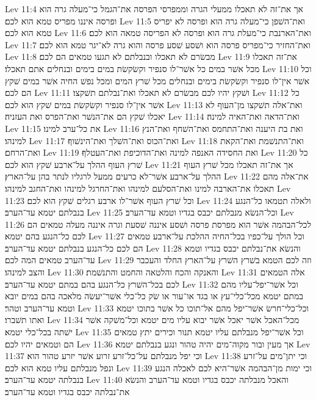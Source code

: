 Lev 11:4  אך את־זה לא תאכלו ממעלי הגרה וממפרסי הפרסה את־הגמל כי־מעלה גרה הוא ופרסה איננו מפריס טמא הוא לכם׃
Lev 11:5  ואת־השׁפן כי־מעלה גרה הוא ופרסה לא יפריס טמא הוא לכם׃
Lev 11:6  ואת־הארנבת כי־מעלת גרה הוא ופרסה לא הפריסה טמאה הוא לכם׃
Lev 11:7  ואת־החזיר כי־מפריס פרסה הוא ושׁסע שׁסע פרסה והוא גרה לא־יגר טמא הוא לכם׃
Lev 11:8  מבשׂרם לא תאכלו ובנבלתם לא תגעו טמאים הם לכם׃
Lev 11:9  את־זה תאכלו מכל אשׁר במים כל אשׁר־לו סנפיר וקשׂקשׂת במים בימים ובנחלים אתם תאכלו׃
Lev 11:10  וכל אשׁר אין־לו סנפיר וקשׂקשׂת בימים ובנחלים מכל שׁרץ המים ומכל נפשׁ החיה אשׁר במים שׁקץ הם לכם׃
Lev 11:11  ושׁקץ יהיו לכם מבשׂרם לא תאכלו ואת־נבלתם תשׁקצו׃
Lev 11:12  כל אשׁר אין־לו סנפיר וקשׂקשׂת במים שׁקץ הוא לכם׃
Lev 11:13  ואת־אלה תשׁקצו מן־העוף לא יאכלו שׁקץ הם את־הנשׁר ואת־הפרס ואת העזניה׃
Lev 11:14  ואת־הדאה ואת־האיה למינה׃
Lev 11:15  את כל־ערב למינו׃
Lev 11:16  ואת בת היענה ואת־התחמס ואת־השׁחף ואת־הנץ למינהו׃
Lev 11:17  ואת־הכוס ואת־השׁלך ואת־הינשׁוף׃
Lev 11:18  ואת־התנשׁמת ואת־הקאת ואת־הרחם׃
Lev 11:19  ואת החסידה האנפה למינה ואת־הדוכיפת ואת־העטלף׃
Lev 11:20  כל שׁרץ העוף ההלך על־ארבע שׁקץ הוא לכם׃
Lev 11:21  אך את־זה תאכלו מכל שׁרץ העוף ההלך על־ארבע אשׁר־לא כרעים ממעל לרגליו לנתר בהן על־הארץ׃
Lev 11:22  את־אלה מהם תאכלו את־הארבה למינו ואת־הסלעם למינהו ואת־החרגל למינהו ואת־החגב למינהו׃
Lev 11:23  וכל שׁרץ העוף אשׁר־לו ארבע רגלים שׁקץ הוא לכם׃
Lev 11:24  ולאלה תטמאו כל־הנגע בנבלתם יטמא עד־הערב׃
Lev 11:25  וכל־הנשׂא מנבלתם יכבס בגדיו וטמא עד־הערב׃
Lev 11:26  לכל־הבהמה אשׁר הוא מפרסת פרסה ושׁסע איננה שׁסעת וגרה איננה מעלה טמאים הם לכם כל־הנגע בהם יטמא׃
Lev 11:27  וכל הולך על־כפיו בכל־החיה ההלכת על־ארבע טמאים הם לכם כל־הנגע בנבלתם יטמא עד־הערב׃
Lev 11:28  והנשׂא את־נבלתם יכבס בגדיו וטמא עד־הערב טמאים המה לכם׃
Lev 11:29  וזה לכם הטמא בשׁרץ השׁרץ על־הארץ החלד והעכבר והצב למינהו׃
Lev 11:30  והאנקה והכח והלטאה והחמט והתנשׁמת׃
Lev 11:31  אלה הטמאים לכם בכל־השׁרץ כל־הנגע בהם במתם יטמא עד־הערב׃
Lev 11:32  וכל אשׁר־יפל־עליו מהם במתם יטמא מכל־כלי־עץ או בגד או־עור או שׂק כל־כלי אשׁר־יעשׂה מלאכה בהם במים יובא וטמא עד־הערב וטהר׃
Lev 11:33  וכל־כלי־חרשׂ אשׁר־יפל מהם אל־תוכו כל אשׁר בתוכו יטמא ואתו תשׁברו׃
Lev 11:34  מכל־האכל אשׁר יאכל אשׁר יבוא עליו מים יטמא וכל־משׁקה אשׁר ישׁתה בכל־כלי יטמא׃
Lev 11:35  וכל אשׁר־יפל מנבלתם עליו יטמא תנור וכירים יתץ טמאים הם וטמאים יהיו לכם׃
Lev 11:36  אך מעין ובור מקוה־מים יהיה טהור ונגע בנבלתם יטמא׃
Lev 11:37  וכי יפל מנבלתם על־כל־זרע זרוע אשׁר יזרע טהור הוא׃
Lev 11:38  וכי יתן־מים על־זרע ונפל מנבלתם עליו טמא הוא לכם׃
Lev 11:39  וכי ימות מן־הבהמה אשׁר־היא לכם לאכלה הנגע בנבלתה יטמא עד־הערב׃
Lev 11:40  והאכל מנבלתה יכבס בגדיו וטמא עד־הערב והנשׂא את־נבלתה יכבס בגדיו וטמא עד־הערב׃
